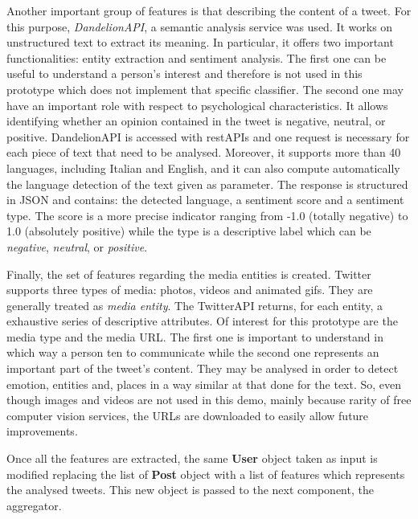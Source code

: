 Another important group of features is that describing the content of a tweet. For this purpose, \textit{DandelionAPI}, a semantic analysis service was used. It works on unstructured text to extract its meaning. 
In particular, it offers two important functionalities: entity extraction and sentiment analysis.
The first one can be useful to understand a person's interest and therefore is not used in this prototype which does not implement that specific classifier.
The second one may have an important role with respect to psychological characteristics.
It allows identifying whether an opinion contained in the tweet is negative, neutral, or positive. 
DandelionAPI is accessed with restAPIs and one request is necessary for each piece of text that need to be analysed. Moreover, it supports more than 40 languages, including Italian and English, and it can also compute automatically the language detection of the text given as parameter.
The response is structured in JSON and contains: the detected language, a sentiment score and a sentiment type.
The score is a more precise indicator ranging from -1.0 (totally negative) to 1.0 (absolutely positive) while the type is a descriptive label which can be \textit{negative}, \textit{neutral}, or \textit{positive}. 

Finally, the set of features regarding the media entities is created. Twitter supports three types of media: photos, videos and animated gifs. They are generally treated as \textit{media entity}.
The TwitterAPI returns, for each entity, a exhaustive series of descriptive attributes. Of interest for this prototype are the media type and the media URL.
The first one is important to understand in which way a person ten to communicate while the second one represents an important part of the tweet's content.
They may be analysed in order to detect emotion, entities and, places in a way similar at that done for the text.
So, even though images and videos are not used in this demo, mainly because rarity of free computer vision services, the URLs are downloaded to easily allow future improvements.

Once all the features are extracted, the same \textbf{User} object taken as input is modified replacing the list of \textbf{Post} object with a list of features which represents the analysed tweets.
This new object is passed to the next component, the aggregator.

